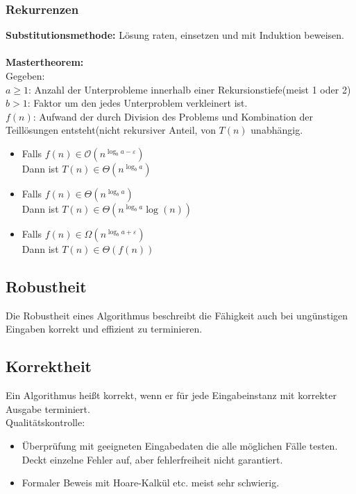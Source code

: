 \documentclass[fs, footer]{latex4ei}
\begin{document}
\begin{multicols*}{4}
\subsubsection{Rekurrenzen}
\textbf{Substitutionsmethode:} Lösung raten, einsetzen und mit Induktion beweisen.\\
\\
\textbf{Mastertheorem:}\\
Gegeben: \\ 
$a\ge1$: Anzahl der Unterprobleme innerhalb einer Rekursionstiefe(meist 1 oder 2) \\
$b>1$: Faktor um den jedes Unterproblem verkleinert ist.\\
$f(n)$: Aufwand der durch Division des Problems und Kombination der Teillösungen entsteht(nicht rekursiver Anteil, von $T(n)$ unabhängig.\\
\begin{itemize}
	\item Falls $f(n) \in \mathcal{O}\left( n^{\log_b a - \varepsilon} \right)$\\
		Dann ist $T(n) \in \Theta\left( n^{\log_b a} \right)$
	\item Falls $f(n) \in \Theta\left( n^{\log_b a} \right)$\\
		Dann ist $T(n) \in \Theta\left( n^{\log_b a} \log(n)\right)$
	\item Falls $f(n) \in \Omega\left( n^{\log_b a + \varepsilon} \right)$\\
		Dann ist $T(n) \in \Theta(f(n))$ 
\end{itemize}

	\subsection{Robustheit}
	Die Robustheit eines Algorithmus beschreibt die Fähigkeit auch bei ungünstigen Eingaben korrekt und effizient zu terminieren. 
	\subsection{Korrektheit}
	Ein Algorithmus heißt korrekt, wenn er für jede Eingabeinstanz mit korrekter Ausgabe terminiert.\\
	Qualitätskontrolle:\\
	\begin{itemize}\itemsep0pt
		\item Überprüfung mit geeigneten Eingabedaten die alle möglichen Fälle testen. Deckt einzelne Fehler auf, aber fehlerfreiheit nicht garantiert.\\
		\item Formaler Beweis mit Hoare-Kalkül etc. meist sehr schwierig.
	\end{itemize}


\end{multicols*}
\end{document}
